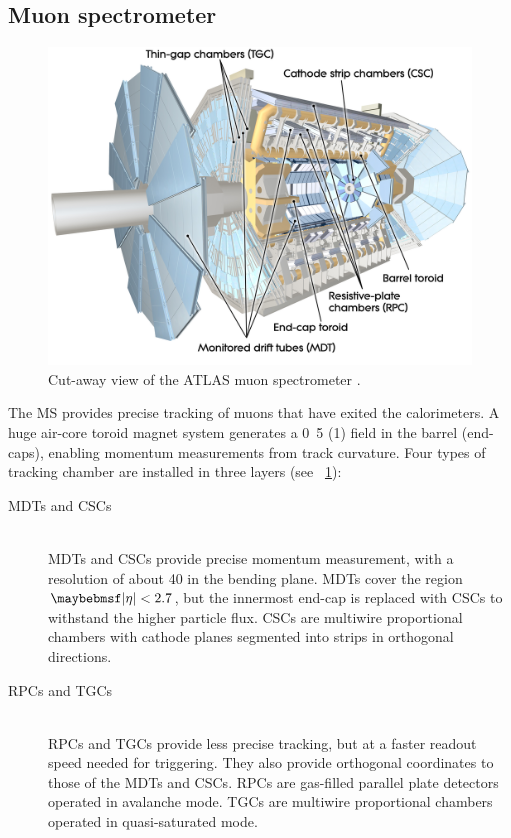 \subsection{Muon spectrometer}

\begin{figure}
	\includegraphics[width=\mediumfigwidth]{tex/experiment/ms_whole}
	\caption{Cut-away view of the ATLAS muon spectrometer \cite{ATLAS-detector}.}
	\label{fig:muon_spectrometer}
\end{figure}

The \ac{MS} provides precise tracking of muons that have exited the calorimeters. A huge 
air-core toroid magnet system generates a \unit{0.5}{\tesla} (\unit{1}{\tesla}) field in 
the barrel (end-caps), enabling momentum measurements from track curvature. Four types of 
tracking chamber are installed in three layers (see \Figure~\ref{fig:muon_spectrometer}):
\begin{description}
\item[\acp{MDT} and \acp{CSC}] \hfill \\
	\acp{MDT} and \acp{CSC} provide precise momentum measurement, with a resolution of 
	about \unit{40}{\micro\metre} in the bending plane. \acp{MDT} cover the region 
	$\mods{\eta} < 2.7$, but the innermost end-cap is replaced with \acp{CSC} to 
	withstand the higher particle flux. \acp{CSC} are multiwire proportional chambers 
	with cathode planes segmented into strips in orthogonal directions.
\item[\acp{RPC} and \acp{TGC}] \hfill \\
	\acp{RPC} and \acp{TGC} provide less precise tracking, but at a faster readout speed 
	needed for triggering. They also provide orthogonal coordinates to those of	the 
	\acp{MDT} and \acp{CSC}. 
	\acp{RPC} are gas-filled parallel plate detectors operated in avalanche mode.
	\acp{TGC} are multiwire proportional chambers operated in quasi-saturated mode.
\end{description}



